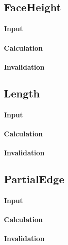 \subsection{FaceHeight}

\paragraph{Input}

\paragraph{Calculation}

\paragraph{Invalidation}

\bigskip

\subsection{Length}

\paragraph{Input}

\paragraph{Calculation}

\paragraph{Invalidation}

\bigskip

\subsection{PartialEdge}

\paragraph{Input}

\paragraph{Calculation}

\paragraph{Invalidation}

